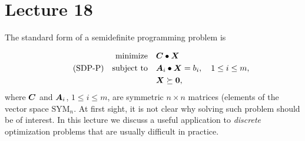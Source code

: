 %
%
% 


\chapter*{Lecture 18}
\addtocounter{chapter}{1}
\addtocounter{section}{-2}


The standard form of a semidefinite programming problem is

\begin{align}\label{eq:sdp-p}\tag{SDP-P}
\begin{split}
 \text{minimize}\quad & \bm{C}\bullet \bm{X}\\
 \quad\text{subject to}\quad & \bm{A}_i\bullet \bm{X} = b_i, \quad 1\leq i\leq m,\\
 & \bm{X} \succeq \bm{0},
 \end{split}
\end{align}
where $\bm{C}$ and $\bm{A}_i$, $1\leq i\leq m$, are symmetric $n\times n$ matrices (elements of the vector space $\mathrm{SYM}_n$. At first sight, it is not clear why solving such problem should be of interest. In this lecture we discuss a useful application to {\em discrete} optimization problems that are usually difficult in practice.

